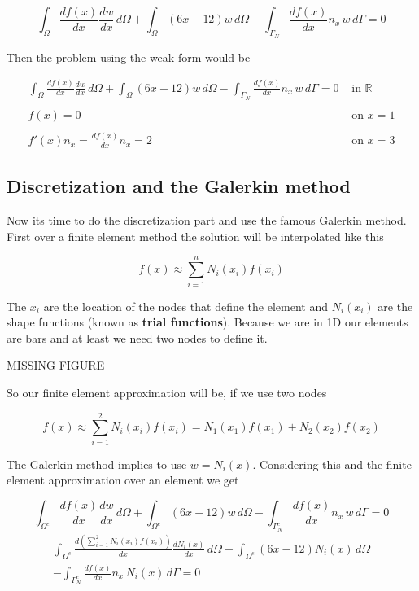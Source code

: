 \documentclass[letterpaper,10pt]{article}
\begin{document}
\begin{equation}
\int_{\Omega} \frac{d f(x)}{d x} \frac{d w}{d x} \, d\Omega + \int_{\Omega} (6x-12) w \, d\Omega - \int_{\Gamma_N} \frac{d f(x)}{d x} n_x \, w \, d\Gamma = 0
\end{equation}

Then the problem using the weak form would be

\begin{equation}
\begin{array}{rl}
\displaystyle
\int_{\Omega} \frac{d f(x)}{d x} \frac{d w}{d x} \, d\Omega + \int_{\Omega} (6x-12) w \, d\Omega - \int_{\Gamma_N} \frac{d f(x)}{d x} n_x \, w \, d\Gamma = 0 & \textrm{ in } \mathbb{R} \\ \\
\displaystyle
f(x) = 0 & \textrm{ on } x = 1 \\ \\
\displaystyle
f'(x) n_x = \frac{d f(x)}{d x} n_x = 2 & \textrm{ on } x = 3 
\end{array}
\label{eq:Problem_WeakForm}
\end{equation}

\subsection{Discretization and the Galerkin method}

Now its time to do the discretization part and use the famous Galerkin method. First over a finite element method the solution will be interpolated like this

\begin{equation}
f(x) \approx \sum_{i=1}^n N_i(x_i) f(x_i)
\end{equation}

The $x_i$ are the location of the nodes that define the element and $N_i(x_i)$ are the shape functions (known as \textbf{trial functions}). Because we are in 1D our elements are bars and at least we need two nodes to define it.

MISSING FIGURE

So our finite element approximation will be, if we use two nodes

\[
f(x) \approx \sum_{i=1}^2 N_i(x_i) f(x_i) = N_1(x_1) f(x_1) + N_2(x_2) f(x_2)
\]

The Galerkin method implies to use $w=N_i(x)$. Considering this and the finite element approximation over an element we get

\begin{small}
\[
\int_{\Omega^e} \frac{d f(x)}{d x} \frac{d w}{d x} \, d\Omega + \int_{\Omega^e} (6x-12) w \, d\Omega - \int_{\Gamma_N^e} \frac{d f(x)}{d x} n_x \, w \, d\Gamma = 0
\]
\begin{multline}
\int_{\Omega^e} \frac{d \left( \sum_{i=1}^2 N_i(x_i)  f(x_i) \right) }{d x} \frac{d N_i(x)}{d x} \, d\Omega + \int_{\Omega^e} (6x-12) N_i(x)\, d\Omega \\
- \int_{\Gamma_N^e} \frac{d f(x)}{d x} n_x \, N_i(x) \, d\Gamma = 0
\end{multline}
\end{small}
\end{document}
